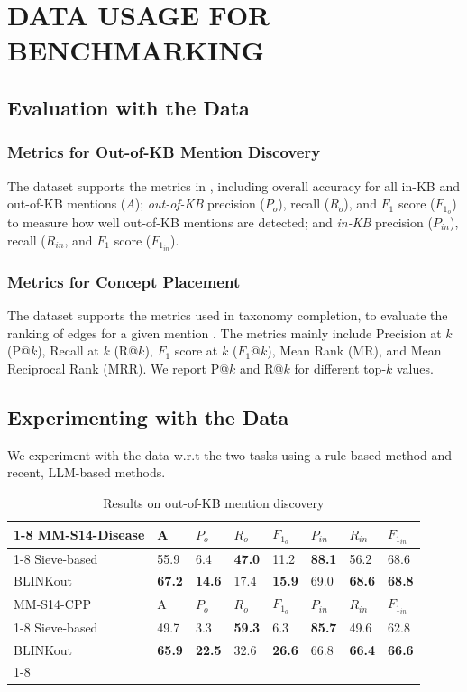 \documentclass[sigconf]{acmart}
\begin{document}
	\section{DATA USAGE FOR BENCHMARKING}
	
	\subsection{Evaluation with the Data}
	\subsubsection*{Metrics for Out-of-KB Mention Discovery} The dataset supports the metrics in \cite{dong2023NIL}, including overall accuracy for all in-KB and out-of-KB mentions ($A$); \textit{out-of-KB} precision ($P_o$), recall ($R_o$), and $F_1$ score ($F_{1_o}$) to measure how well out-of-KB mentions are detected; and \textit{in-KB} precision ($P_{in}$), recall ($R_{in}$, and $F_1$ score ($F_{1_{in}}$).
	
	\subsubsection*{Metrics for Concept Placement} The dataset supports the metrics used in taxonomy completion, to evaluate the ranking of edges for a given mention \cite{zhang2021TMN,Jiang2022taxoenrich,Shen2020TaxoExpan}. The metrics mainly include Precision at $k$ (P@$k$), Recall at $k$ (R@$k$), $F_1$ score at $k$ ($F_1$@$k$), Mean Rank (MR), and Mean Reciprocal Rank (MRR). We report P@$k$ and R@$k$ for different top-$k$ values. 
	
	\subsection{Experimenting with the Data}
	We experiment with the data w.r.t the two tasks using a rule-based method and recent, LLM-based methods.
	
	\begin{table}
		\small
		\caption{Results on out-of-KB mention discovery}\label{out-of-KB-res}
		\begin{tabular}{l|l|lll|lll}
			\cline{1-8}
			MM-S14-Disease & A & $P_o$ & $R_o$ & $F_{1_o}$ & $P_{in}$ & $R_{in}$ & $F_{1_{in}}$    \\
			\cline{1-8}
			Sieve-based & 55.9 & 6.4      & \textbf{47.0}  & 11.2 & \textbf{88.1} & 56.2 & 68.6  \\
			BLINKout       & \textbf{67.2} & \textbf{14.6}      & 17.4     & \textbf{15.9} & 69.0 & \textbf{68.6} & \textbf{68.8}  \\
			\hline\hline
			MM-S14-CPP     & A & $P_o$ & $R_o$ & $F_{1_o}$ & $P_{in}$ & $R_{in}$ & $F_{1_{in}}$    \\
			\cline{1-8}
			Sieve-based & 49.7 & 3.3      & \textbf{59.3}   & 6.3 & \textbf{85.7} & 49.6 & 62.8  \\
			BLINKout       & \textbf{65.9} & \textbf{22.5}          & 32.6      & \textbf{26.6} & 66.8 & \textbf{66.4} & \textbf{66.6}     \\
			\cline{1-8}
		\end{tabular}
	\end{table}
	
\end{document}
